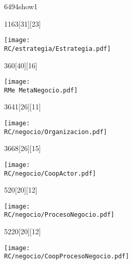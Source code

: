 \begin{NuevaPagina}{64}{94}{show1}
	\begin{NuevoParrafo}{11}{63}[31][23]
		\begin{Marco}[\LineaSupC][\LineaInfC][\LineaIzqC][\LineaDerC][CBlanco]
			\subseccionC{\PVEtg}%
			\centering\texttt{[image: \\RC/estrategia/Estrategia.pdf]}		
		\end{Marco}
	\end{NuevoParrafo}	
	\begin{NuevoParrafo}{36}{0}[40][16]
		\begin{Marco}[\LineaSupC][\LineaInfC][\LineaIzqC][\LineaDerC][CBlanco]
			\centering\texttt{[image: \\RMe MetaNegocio.pdf]}
		\end{Marco}
	\end{NuevoParrafo}
	
	\begin{NuevoParrafo}{36}{41}[26][11]
		\begin{Marco}[\LineaSupC][\LineaInfC][\LineaIzqC][\LineaDerC][CBlanco]
			\subseccionC{\PVOrg}%
			\centering\texttt{[image: \\RC/negocio/Organizacion.pdf]}
		\end{Marco}
	\end{NuevoParrafo}
	
	\begin{NuevoParrafo}{36}{68}[26][15]
		\begin{Marco}[\LineaSupC][\LineaInfC][\LineaIzqC][\LineaDerC][CBlanco]
			\subseccionC{\PVCAc}%
			\centering\texttt{[image: \\RC/negocio/CoopActor.pdf]}
		\end{Marco}
	\end{NuevoParrafo}
	
	\begin{NuevoParrafo}{52}{0}[20][12]
		\begin{Marco}[\LineaSupC][\LineaInfC][\LineaIzqC][\LineaDerC][CBlanco]
			\subseccionC{\PVPNe}%
			\centering\texttt{[image: \\RC/negocio/ProcesoNegocio.pdf]}
		\end{Marco}
	\end{NuevoParrafo}
	
	\begin{NuevoParrafo}{52}{20}[20][12]
		\begin{Marco}[\LineaSupC][\LineaInfC][\LineaIzqC][\LineaDerC][CBlanco]
			\subseccionC{\PVCPN}%
			\centering\texttt{[image: \\RC/negocio/CoopProcesoNegocio.pdf]}
		\end{Marco}
	\end{NuevoParrafo}
	

\end{NuevaPagina}
